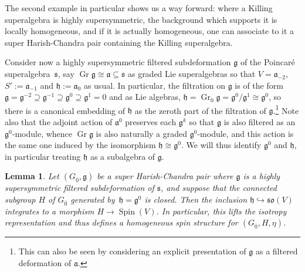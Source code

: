 \documentclass[pdftex]{sigma}
\numberwithin{equation}{section}
\newtheorem{Lemma}[Theorem]{Lemma}
\newcommand{\fa}{\mathfrak{a}}
\newcommand{\fg}{\mathfrak{g}}
\newcommand{\fh}{\mathfrak{h}}
\newcommand{\fs}{\mathfrak{s}}
\newcommand{\fso}{\mathfrak{so}}
\newcommand{\1}{\mathbbm{1}}
\DeclareMathOperator{\Spin}{Spin}
\DeclareMathOperator{\Gr}{Gr}
\begin{document}
The second example in particular shows us a way forward: where a Killing superalgebra is highly supersymmetric, the background which supports it is locally homogeneous, and if it is actually homogeneous, one can associate to it a super Harish-Chandra pair containing the Killing superalgebra.

Consider now a highly supersymmetric filtered subdeformation $\fg$ of the Poincar\'e superalgebra~$\fs$, say $\Gr\fg\cong\fa\subseteq\fs$ as graded Lie superalgebras so that $V=\fa_{-2}$, $S':=\fa_{-1}$ and $\fh:=\fa_0$ as usual. In particular, the filtration on $\fg$ is of the form $\fg=\fg^{-2}\supseteq\fg^{-1}\supseteq\fg^0\supseteq\fg^1=0$ and as Lie algebras, $\fh=\Gr_0\fg=\fg^0/\fg^1\cong\fg^0$, so there is a canonical embedding of $\fh$ as the zeroth part of the filtration of $\fg$.\footnote{This can also be seen by considering an explicit presentation of $\fg$ as a filtered deformation of $\fa$.}
Note also that the adjoint action of $\fa^0$ preserves each $\fg^k$ so that $\fg$ is also filtered as an $\fg^0$-module, whence $\Gr\fg$ is also naturally a graded $\fg^0$-module, and this action is the same one induced by the isomorphism $\fh\cong\fg^0$. We will thus identify $\fg^0$ and $\fh$, in particular treating $\fh$ as a subalgebra of $\fg$.

\begin{Lemma}\label{lemma:spin-lift-Ad}
	Let $(G_{\overline0},\fg)$ be a super Harish-Chandra pair where $\fg$ is a highly supersymmetric filtered subdeformation of $\fs$, and suppose that the connected subgroup $H$ of $G_{\overline0}$ generated by~${\fh=\fg^0}$ is closed. Then the inclusion $\fh\hookrightarrow\fso(V)$ integrates to a morphism $H\to\Spin(V)$. In particular, this lifts the isotropy representation and thus defines a homogeneous spin structure for $(G_{\overline0},H,\eta)$.
\end{Lemma}
\end{document}

